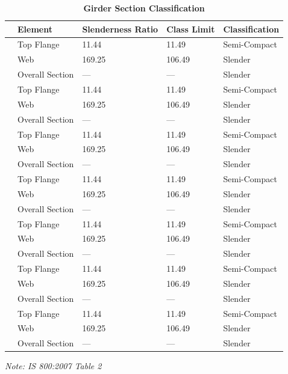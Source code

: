 \documentclass[12pt,a4paper]{report}
\numberwithin{table}{chapter}
\numberwithin{figure}{chapter}
\begin{document}
\vspace{1em}
\begin{longtable}{|C{2.5cm}|L{3cm}|C{3.5cm}|C{2.5cm}|>{\centering\arraybackslash}p{4.0cm}|}
\caption{\textbf{Girder Section Classification}}
\hline
\textbf{} & \textbf{Element} & \textbf{Slenderness Ratio} & \textbf{Class Limit} & \textbf{Classification} \\[6pt]
\hline
{} & Top Flange & 11.44 & 11.49 & Semi-Compact \\[6pt]
 & Web & 169.25 & 106.49 & Slender \\[6pt]
 & Overall Section & --- & --- & Slender \\[6pt]
\hline
{} & Top Flange & 11.44 & 11.49 & Semi-Compact \\[6pt]
 & Web & 169.25 & 106.49 & Slender \\[6pt]
 & Overall Section & --- & --- & Slender \\[6pt]
\hline
{} & Top Flange & 11.44 & 11.49 & Semi-Compact \\[6pt]
 & Web & 169.25 & 106.49 & Slender \\[6pt]
 & Overall Section & --- & --- & Slender \\[6pt]
\hline
{} & Top Flange & 11.44 & 11.49 & Semi-Compact \\[6pt]
 & Web & 169.25 & 106.49 & Slender \\[6pt]
 & Overall Section & --- & --- & Slender \\[6pt]
\hline
{} & Top Flange & 11.44 & 11.49 & Semi-Compact \\[6pt]
 & Web & 169.25 & 106.49 & Slender \\[6pt]
 & Overall Section & --- & --- & Slender \\[6pt]
\hline
{} & Top Flange & 11.44 & 11.49 & Semi-Compact \\[6pt]
 & Web & 169.25 & 106.49 & Slender \\[6pt]
 & Overall Section & --- & --- & Slender \\[6pt]
\hline
{} & Top Flange & 11.44 & 11.49 & Semi-Compact \\[6pt]
 & Web & 169.25 & 106.49 & Slender \\[6pt]
 & Overall Section & --- & --- & Slender \\[6pt]
\hline
\end{longtable}
\noindent\textit{Note: IS 800:2007 Table 2}
\end{document}
